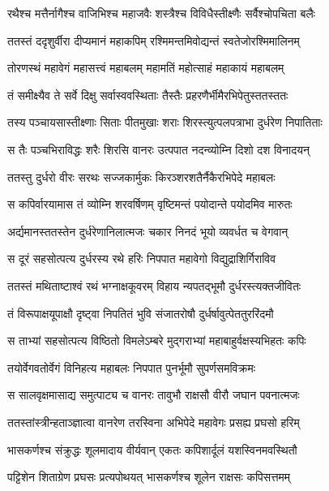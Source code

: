 \twolineshloka
{रथैश्च मत्तैर्नागैश्च वाजिभिश्च महाजवैः}
{शस्त्रैश्च विविधैस्तीक्ष्णैः सर्वैश्चोपचिता बलैः} %

\twolineshloka
{ततस्तं ददृशुर्वीरा दीप्यमानं महाकपिम्}
{रश्मिमन्तमिवोद्यन्तं स्वतेजोरश्मिमालिनम्} %

\twolineshloka
{तोरणस्थं महावेगं महासत्त्वं महाबलम्}
{महामतिं महोत्साहं महाकायं महाबलम्} %

\twolineshloka
{तं समीक्ष्यैव ते सर्वे दिक्षु सर्वास्ववस्थिताः}
{तैस्तैः प्रहरणैर्भीमैरभिपेतुस्ततस्ततः} %

\twolineshloka
{तस्य पञ्चायसास्तीक्ष्णाः सिताः पीतमुखाः शराः}
{शिरस्त्युत्पलपत्राभा दुर्धरेण निपातिताः} %

\twolineshloka
{स तैः पञ्चभिराविद्धः शरैः शिरसि वानरः}
{उत्पपात नदन्व्योम्नि दिशो दश विनादयन्} %

\twolineshloka
{ततस्तु दुर्धरो वीरः सरथः सज्जकार्मुकः}
{किरञ्शरशतैर्नैकैरभिपेदे महाबलः} %

\twolineshloka
{स कपिर्वारयामास तं व्योम्नि शरवर्षिणम्}
{वृष्टिमन्तं पयोदान्ते पयोदमिव मारुतः} %

\twolineshloka
{अर्द्यमानस्ततस्तेन दुर्धरेणानिलात्मजः}
{चकार निनदं भूयो व्यवर्धत च वेगवान्} %

\twolineshloka
{स दूरं सहसोत्पत्य दुर्धरस्य रथे हरिः}
{निपपात महावेगो विद्युद्राशिर्गिराविव} %

\twolineshloka
{ततस्तं मथिताष्टाश्वं रथं भग्नाक्षकूवरम्}
{विहाय न्यपतद्भूमौ दुर्धरस्त्यक्तजीवितः} %

\twolineshloka
{तं विरूपाक्षयूपाक्षौ दृष्ट्वा निपतितं भुवि}
{संजातरोषौ दुर्धर्षावुत्पेततुररिंदमौ} %

\twolineshloka
{स ताभ्यां सहसोत्पत्य विष्ठितो विमलेऽम्बरे}
{मुद्गराभ्यां महाबाहुर्वक्षस्यभिहतः कपिः} %

\twolineshloka
{तयोर्वेगवतोर्वेगं विनिहत्य महाबलः}
{निपपात पुनर्भूमौ सुपर्णसमविक्रमः} %

\twolineshloka
{स सालवृक्षमासाद्य समुत्पाट्य च वानरः}
{तावुभौ राक्षसौ वीरौ जघान पवनात्मजः} %

\twolineshloka
{ततस्तांस्त्रीन्हताञ्ज्ञात्वा वानरेण तरस्विना}
{अभिपेदे महावेगः प्रसह्य प्रघसो हरिम्} %

\twolineshloka
{भासकर्णश्च संक्रुद्धः शूलमादाय वीर्यवान्}
{एकतः कपिशार्दूलं यशस्विनमवस्थितौ} %

\twolineshloka
{पट्टिशेन शिताग्रेण प्रघसः प्रत्यपोथयत्}
{भासकर्णश्च शूलेन राक्षसः कपिसत्तमम्} %

